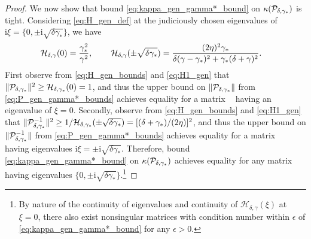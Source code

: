 \documentclass[a4paper,10pt]{article}
\DeclareMathOperator{\cL}{\widehat{\mathcal{L}}}
\begin{document}
\begin{proof}
We now show that bound \eqref{eq:kappa_gen_gamma*_bound} on $\kappa({\cal P}_{\delta,\gamma_*})$
is tight. Considering \eqref{eq:H_gen_def} at the judiciously chosen eigenvalues of
$\mathrm{i} \xi = \{ 0, \pm \mathrm{i} \sqrt{\delta \gamma_*}\}$, we have
%
\begin{align}
\label{eq:H1_gen}
{\cal H}_{\delta,\gamma}(0) 
	&= \frac{\gamma_*^2}{\gamma^2}, 
\hspace{5ex}
{\cal H}_{\delta,\gamma}(\pm \sqrt{\delta \gamma_*}) = 
	\frac{(2 \eta)^2 \gamma_*}{\delta( \gamma- \gamma_*)^2 + \gamma_* (\delta + \gamma)^2 }.
\end{align}
%
First observe from \eqref{eq:H_gen_bounds} and \eqref{eq:H1_gen} that $\Vert {\cal
P}_{\delta,\gamma_*} \Vert^2 \geq {\cal H}_{\delta,\gamma_*}(0) = 1$, and thus the upper bound
on $\Vert {\cal P}_{\delta,\gamma_*} \Vert$ from \eqref{eq:P_gen_gamma*_bounds} achieves
equality for a matrix $\cL$ having an eigenvalue of $\xi = 0$.
Secondly, observe from \eqref{eq:H_gen_bounds} and \eqref{eq:H1_gen} that $\Vert {\cal
P}_{\delta,\gamma_*}^{-1} \Vert^2 \geq 1/{\cal H}_{\delta,\gamma_*}(\pm \sqrt{\delta  \gamma_*})= [(\delta + \gamma_*)/(2\eta)]^2$, and thus the upper bound on $\Vert {\cal
P}_{\delta,\gamma_*}^{-1} \Vert$ from \eqref{eq:P_gen_gamma*_bounds} achieves equality for
a matrix $\cL$ having eigenvalues $\mathrm{i} \xi = \pm \mathrm{i} \sqrt{\delta \gamma_*}$.
Therefore, bound \eqref{eq:kappa_gen_gamma*_bound} on $\kappa({\cal P}_{\delta,\gamma_*})$
achieves equality for any matrix $\cL$ having eigenvalues $\{0, \pm
\mathrm{i}\sqrt{\delta \gamma_*}\}$.\footnote{By nature of the continuity of
eigenvalues and continuity of $\mathcal{H}_{\delta,\gamma}(\xi)$ at $\xi = 0$, there
also exist nonsingular matrices with condition number within
$\epsilon$ of \eqref{eq:kappa_gen_gamma*_bound} for any $\epsilon > 0$.}


\end{proof}
\end{document}
